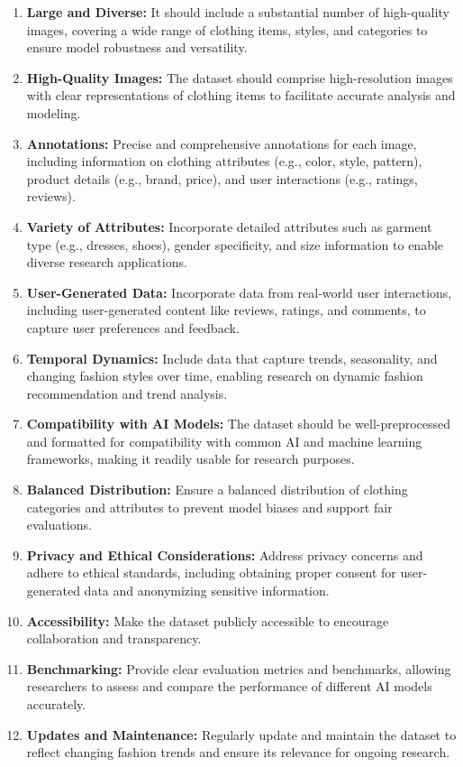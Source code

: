 		\begin{enumerate}
			\item \textbf{Large and Diverse:} It should include a substantial number of high-quality images, covering a wide range of clothing items, styles, and categories to ensure model robustness and versatility.
			\item \textbf{High-Quality Images:} The dataset should comprise high-resolution images with clear representations of clothing items to facilitate accurate analysis and modeling.
			\item \textbf{Annotations:} Precise and comprehensive annotations for each image, including information on clothing attributes (e.g., color, style, pattern), product details (e.g., brand, price), and user interactions (e.g., ratings, reviews).
			\item \textbf{Variety of Attributes:} Incorporate detailed attributes such as garment type (e.g., dresses, shoes), gender specificity, and size information to enable diverse research applications.
			\item \textbf{User-Generated Data:} Incorporate data from real-world user interactions, including user-generated content like reviews, ratings, and comments, to capture user preferences and feedback.
			\item \textbf{Temporal Dynamics:} Include data that capture trends, seasonality, and changing fashion styles over time, enabling research on dynamic fashion recommendation and trend analysis.
			\item \textbf{Compatibility with AI Models:} The dataset should be well-preprocessed and formatted for compatibility with common AI and machine learning frameworks, making it readily usable for research purposes.
			\item \textbf{Balanced Distribution:} Ensure a balanced distribution of clothing categories and attributes to prevent model biases and support fair evaluations.
			\item \textbf{Privacy and Ethical Considerations:} Address privacy concerns and adhere to ethical standards, including obtaining proper consent for user-generated data and anonymizing sensitive information.
			\item \textbf{Accessibility:} Make the dataset publicly accessible to encourage collaboration and transparency.
			\item \textbf{Benchmarking:} Provide clear evaluation metrics and benchmarks, allowing researchers to assess and compare the performance of different AI models accurately.
			\item \textbf{Updates and Maintenance:} Regularly update and maintain the dataset to reflect changing fashion trends and ensure its relevance for ongoing research.
		\end{enumerate}

